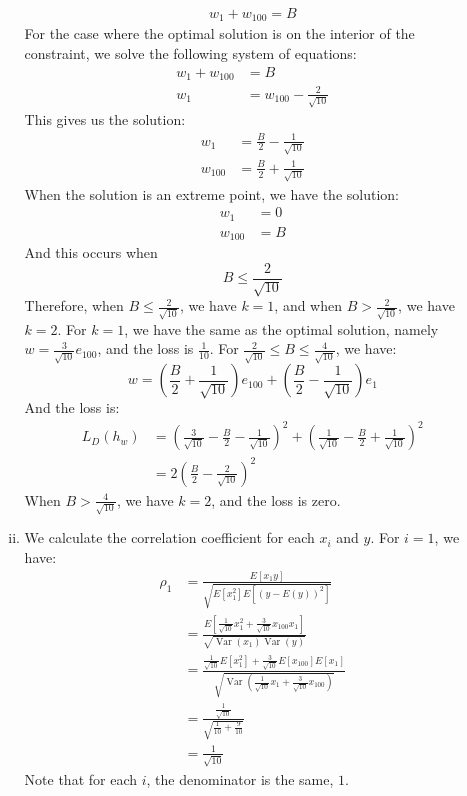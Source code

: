 \documentclass{amsart}
\DeclareMathOperator{\Var}{Var}  %
\theoremstyle{definition}
\begin{document}
\begin{enumerate}[(a)]
\begin{enumerate}[i.]
\begin{align*}
          w_1 + w_{100} = B
        \end{align*}
        For the case where the optimal solution is on the interior of the constraint, we solve the following system of equations:
        \begin{align*}
          w_1 + w_{100} &= B\\
          w_1 &= w_{100} - \frac{2}{\sqrt{10}}
        \end{align*}
        This gives us the solution:
        \begin{align*}
          w_1 &= \frac{B}{2} - \frac{1}{\sqrt{10}}\\
          w_{100} &= \frac{B}{2} + \frac{1}{\sqrt{10}}
        \end{align*}
        When the solution is an extreme point, we have the solution:
        \begin{align*}
          w_1 &= 0\\
          w_{100} &= B
        \end{align*}
        And this occurs when
        \[B \le \frac{2}{\sqrt{10}}\]
        Therefore, when $B \le \frac{2}{\sqrt{10}}$, we have $k = 1$, and when $B > \frac{2}{\sqrt{10}}$, we have $k = 2$.
        For $k=1$, we have the same as the optimal solution, namely $w = \frac{3}{\sqrt{10}} e_{100}$, and the loss is $\frac{1}{10}$.
        For $\frac{2}{\sqrt{10}} \le B \le \frac{4}{\sqrt{10}}$, we have:
        \[w = \left(\frac{B}{2} + \frac{1}{\sqrt{10}}\right) e_{100} + \left(\frac{B}{2} - \frac{1}{\sqrt{10}}\right) e_1\]
        And the loss is:
        \begin{align*}
          L_D(h_w) &= \left(\frac{3}{\sqrt{10}} - \frac{B}{2} - \frac{1}{\sqrt{10}}\right)^2 + \left(\frac{1}{\sqrt{10}} - \frac{B}{2} + \frac{1}{\sqrt{10}}\right)^2\\
          &= 2 \left(\frac{B}{2} - \frac{2}{\sqrt{10}}\right)^2
        \end{align*}
        When $B > \frac{4}{\sqrt{10}}$, we have $k = 2$, and the loss is zero.
      \item
        We calculate the correlation coefficient for each $x_i$ and $y$. For $i = 1$, we have:
        \begin{align*}
          \rho_1 &= \frac{E[x_1 y]}{\sqrt{E[x_1^2] E[(y - E(y))^2]}}\\
          &= \frac{E\left[\frac{1}{\sqrt{10}} x_1^2 + \frac{3}{\sqrt{10}} x_{100} x_1\right]}{\sqrt{\Var(x_1) \Var(y)}}\\
          &= \frac{\frac{1}{\sqrt{10}} E[x_1^2] + \frac{3}{\sqrt{10}} E[x_{100}] E[x_1]}{\sqrt{\Var\left(\frac{1}{\sqrt{10}} x_1 + \frac{3}{\sqrt{10}} x_{100}\right)}}\\
          &= \frac{\frac{1}{\sqrt{10}}}{\sqrt{\frac{1}{10} + \frac{9}{10}}}\\
          &= \frac{1}{\sqrt{10}} 
        \end{align*}
        Note that for each $i$, the denominator is the same, $1$. 


\end{enumerate}
\end{enumerate}
\end{document}
